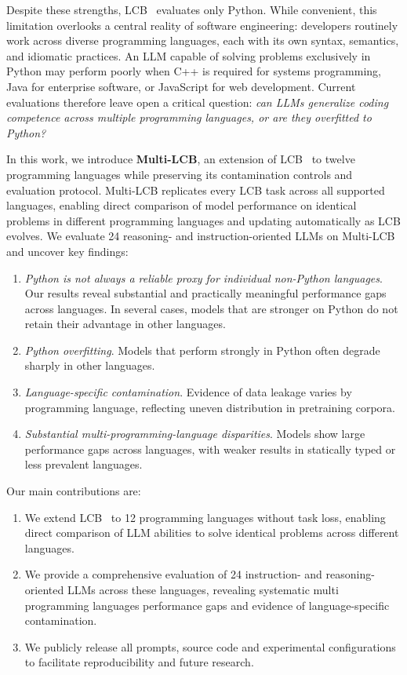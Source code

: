 \documentclass{llmxive}
\begin{document}
Despite these strengths, LCB~\citep{jain2024livecodebench} evaluates only Python. While convenient, this limitation overlooks a central reality of software engineering: developers routinely work across diverse programming languages, each with its own syntax, semantics, and idiomatic practices. An LLM capable of solving problems exclusively in Python may perform poorly when C++ is required for systems programming, Java for enterprise software, or JavaScript for web development. Current evaluations therefore leave open a critical question: \textit{can LLMs generalize coding competence across multiple programming languages, or are they overfitted to Python?}


In this work, we introduce \textbf{Multi-LCB}, an extension of LCB~\citep{jain2024livecodebench} to twelve programming languages while preserving its contamination controls and evaluation protocol.  
Multi-LCB replicates every LCB task across all supported languages, enabling direct comparison of model performance on identical problems in different programming languages and updating automatically as LCB evolves. We evaluate 24 reasoning- and instruction-oriented LLMs on Multi-LCB and uncover key findings:
\begin{enumerate}
\item \textit{Python is not always a reliable proxy for individual non-Python languages}.  Our results reveal substantial and practically meaningful performance gaps across languages. In several cases, models that are stronger on Python do not retain their advantage in other languages.
    \item \textit{Python overfitting}. Models that perform strongly in Python often degrade sharply in other languages.
    \item \textit{Language-specific contamination}. Evidence of data leakage varies by programming language, reflecting uneven distribution in pretraining corpora.
    \item \textit{Substantial multi-programming-language disparities}. Models show large performance gaps across languages, with weaker results in statically typed or less prevalent languages.
\end{enumerate}

Our main contributions are:
\begin{enumerate}
\item We extend LCB~\citep{jain2024livecodebench} to 12 programming languages without task loss, enabling direct comparison of LLM abilities to solve identical problems across different languages.
\item We provide a comprehensive evaluation of 24 instruction- and reasoning-oriented LLMs across these languages, revealing systematic multi programming languages performance gaps and evidence of language-specific contamination.
\item We publicly release all prompts, source code and experimental configurations  %
to facilitate reproducibility and future research.
\end{enumerate}
\end{document}

